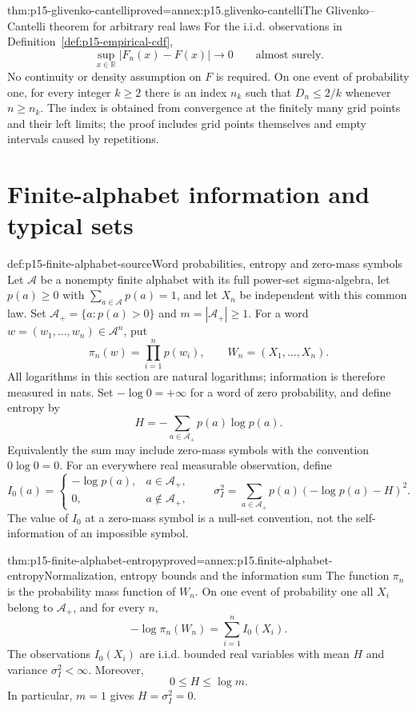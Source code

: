 \begin{hbtheorem}{thm:p15-glivenko-cantelli}{proved=annex:p15.glivenko-cantelli}{The Glivenko--Cantelli theorem for arbitrary real laws}
For the i.i.d. observations in
Definition~\ref{def:p15-empirical-cdf},
\[
 \sup_{x\in\mathbb R}|F_n(x)-F(x)|\longrightarrow0
                                  \qquad\text{almost surely}.
\]
No continuity or density assumption on \(F\) is required. On one
event of probability one, for every integer \(k\geq2\) there is an
index \(n_k\) such that \(D_n\leq2/k\) whenever \(n\geq n_k\).
The index is obtained from convergence at the finitely many grid points
and their left limits; the proof includes grid points themselves and
empty intervals caused by repetitions.
\end{hbtheorem}

\section{Finite-alphabet information and typical sets}
\label{sec:p15-finite-alphabet-information}

\begin{hbdefinition}{def:p15-finite-alphabet-source}{Word probabilities, entropy and zero-mass symbols}
Let \(\mathcal A\) be a nonempty finite alphabet with its full
power-set sigma-algebra, let
\(p(a)\geq0\) with \(\sum_{a\in\mathcal A}p(a)=1\), and let
\(X_n\) be independent with this common law.
Set \(\mathcal A_+=\{a:p(a)>0\}\) and \(m=|\mathcal A_+|\geq1\).
For a word \(w=(w_1,\ldots,w_n)\in\mathcal A^n\), put
\[
 \pi_n(w)=\prod_{i=1}^np(w_i),\qquad W_n=(X_1,\ldots,X_n).
\]
All logarithms in this section are natural logarithms; information is
therefore measured in nats. Set \(-\log0=+\infty\) for a word of
zero probability, and define entropy by
\[
 H=-\sum_{a\in\mathcal A_+}p(a)\log p(a).
\]
Equivalently the sum may include zero-mass symbols with the convention
\(0\log0=0\).
For an everywhere real measurable observation, define
\[
 I_0(a)=
 \begin{cases}-\log p(a),&a\in\mathcal A_+,\\0,&a\notin\mathcal A_+,\end{cases}
 \qquad
 \sigma_I^2=\sum_{a\in\mathcal A_+}p(a)(-\log p(a)-H)^2.
\]
The value of \(I_0\) at a zero-mass symbol is a null-set convention,
not the self-information of an impossible symbol.
\end{hbdefinition}

\begin{hblemma}{thm:p15-finite-alphabet-entropy}{proved=annex:p15.finite-alphabet-entropy}{Normalization, entropy bounds and the information sum}
The function \(\pi_n\) is the probability mass function of \(W_n\).
On one event of probability one all \(X_i\) belong to
\(\mathcal A_+\), and for every \(n\),
\[
 -\log\pi_n(W_n)=\sum_{i=1}^n I_0(X_i).
\]
The observations \(I_0(X_i)\) are i.i.d. bounded real variables with
mean \(H\) and variance \(\sigma_I^2<\infty\). Moreover,
\[
 0\leq H\leq\log m.
\]
In particular, \(m=1\) gives \(H=\sigma_I^2=0\).
\end{hblemma}

